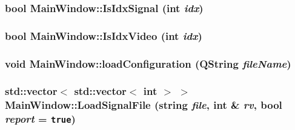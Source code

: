 \hypertarget{class_main_window_fbeb66a077c76bfc5b4b2c7a46a063e1}{
\subsubsection[{IsIdxSignal}]{\setlength{\rightskip}{0pt plus 5cm}bool MainWindow::IsIdxSignal (int {\em idx})}}
\label{class_main_window_fbeb66a077c76bfc5b4b2c7a46a063e1}


\hypertarget{class_main_window_b8b412425029ced77c6603e33582dd7c}{
\subsubsection[{IsIdxVideo}]{\setlength{\rightskip}{0pt plus 5cm}bool MainWindow::IsIdxVideo (int {\em idx})}}
\label{class_main_window_b8b412425029ced77c6603e33582dd7c}


\hypertarget{class_main_window_592659d6abd1ead74cc8b711bedb1c46}{
\subsubsection[{loadConfiguration}]{\setlength{\rightskip}{0pt plus 5cm}void MainWindow::loadConfiguration (QString {\em fileName})}}
\label{class_main_window_592659d6abd1ead74cc8b711bedb1c46}


\hypertarget{class_main_window_d5a267c6b9f511f4f128fdf465fe935b}{
\subsubsection[{LoadSignalFile}]{\setlength{\rightskip}{0pt plus 5cm}std::vector$<$ std::vector$<$ int $>$ $>$ MainWindow::LoadSignalFile (string {\em file}, \/  int \& {\em rv}, \/  bool {\em report} = {\tt true})}}
\label{class_main_window_d5a267c6b9f511f4f128fdf465fe935b}


